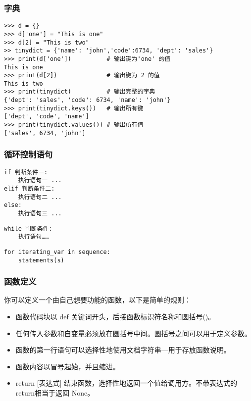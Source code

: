 \subsubsection{字典}
\begin{verbatim}
>>> d = {}
>>> d['one'] = "This is one"
>>> d[2] = "This is two"
>> tinydict = {'name': 'john','code':6734, 'dept': 'sales'}
>>> print(d['one'])          # 输出键为'one' 的值
This is one
>>> print(d[2])              # 输出键为 2 的值
This is two
>>> print(tinydict)          # 输出完整的字典
{'dept': 'sales', 'code': 6734, 'name': 'john'}
>>> print(tinydict.keys())   # 输出所有键
['dept', 'code', 'name']
>>> print(tinydict.values()) # 输出所有值
['sales', 6734, 'john']
\end{verbatim}

\subsubsection{循环控制语句}

\begin{verbatim}
if 判断条件一:
    执行语句一 ...
elif 判断条件二:
    执行语句二 ...
else:
    执行语句三 ...
\end{verbatim}

\begin{verbatim}
while 判断条件:
    执行语句……
\end{verbatim}

\begin{verbatim}
for iterating_var in sequence:
    statements(s)
\end{verbatim}

\subsubsection{函数定义}
你可以定义一个由自己想要功能的函数，以下是简单的规则：
\begin{itemize}
\item 函数代码块以 def 关键词开头，后接函数标识符名称和圆括号()。
\item 任何传入参数和自变量必须放在圆括号中间。圆括号之间可以用于定义参数。
\item 函数的第一行语句可以选择性地使用文档字符串—用于存放函数说明。
\item 函数内容以冒号起始，并且缩进。
\item return [表达式] 结束函数，选择性地返回一个值给调用方。不带表达式的return相当于返回 None。
\end{itemize}

